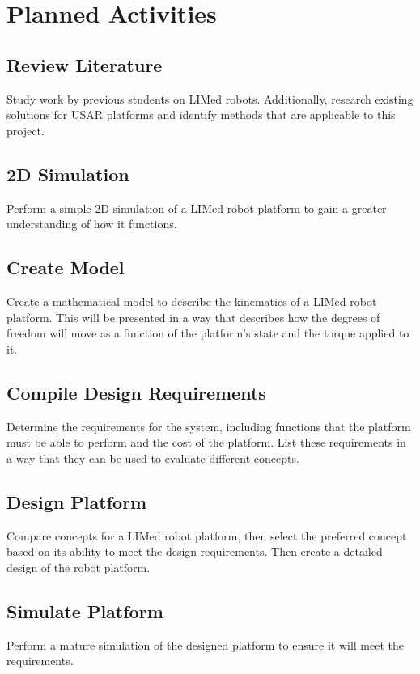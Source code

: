 \chapter{Planned Activities}

\section{Review Literature}
Study work by previous students on LIMed robots. Additionally, research existing solutions for USAR platforms and identify methods that are applicable to this project. 

\section{2D Simulation}
Perform a simple 2D simulation of a LIMed robot platform to gain a greater understanding of how it functions.

\section{Create Model}
Create a mathematical model to describe the kinematics of a LIMed robot platform. This will be presented in a way that describes how the degrees of freedom will move as a function of the platform's state and the torque applied to it.

\section{Compile Design Requirements}
Determine the requirements for the system, including functions that the platform must be able to perform and the cost of the platform. List these requirements in a way that they can be used to evaluate different concepts.

\section{Design Platform}
Compare concepts for a LIMed robot platform, then select the preferred concept based on its ability to meet the design requirements. Then create a detailed design of the robot platform.

\section{Simulate Platform}
Perform a mature simulation of the designed platform to ensure it will meet the requirements.


